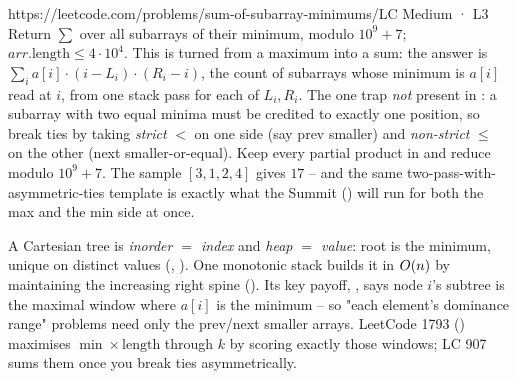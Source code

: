 \begin{practiceset}
    {https://leetcode.com/problems/sum-of-subarray-minimums/}{LC Medium · L3}
    {Return $\sum$ over all subarrays of their minimum, modulo $10^9+7$; $\mathit{arr}.\text{length}\le 4\cdot10^4$.
    This is  turned from a maximum into a sum: the answer is
    $\sum_i a[i]\cdot(i-L_i)\cdot(R_i-i)$, the count of subarrays whose minimum is $a[i]$ read at $i$,
    from one stack pass for each of $L_i, R_i$. The one trap \emph{not} present in :
    a subarray with two equal minima must be credited to exactly one position, so break ties by taking
    \emph{strict} $<$ on one side (say prev smaller) and \emph{non-strict} $\le$ on the other (next
    smaller-or-equal). Keep every partial product in  and reduce modulo $10^9+7$. The
    sample $[3,1,2,4]$ gives $17$ -- and the same two-pass-with-asymmetric-ties template is exactly what
    the Summit () will run for both the max and the min side at once.}
\end{practiceset}

\begin{recallbox}
A Cartesian tree is \emph{inorder $=$ index} and \emph{heap $=$ value}: root is the minimum, unique on
distinct values (, ). One monotonic stack builds it in
$O(n)$ by maintaining the increasing right spine (). Its key payoff,
, says node $i$'s subtree is the maximal window where $a[i]$ is the minimum -- so
"each element's dominance range" problems need only the prev/next smaller arrays. LeetCode 1793
() maximises $\min\times\text{length}$ through $k$ by scoring exactly those windows;
LC 907 sums them once you break ties asymmetrically.
\end{recallbox}
